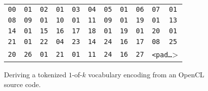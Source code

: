 \begin{figure}
{\begin{tabular}{l l l l l l l l l l l}
			\toprule
			\texttt{00} & \texttt{01} & \texttt{02} & \texttt{01} & \texttt{03} & \texttt{04} & \texttt{05} & \texttt{01} & \texttt{06} & \texttt{07} & \texttt{01} \\
			\texttt{08} & \texttt{09} & \texttt{01} & \texttt{10} & \texttt{01} & \texttt{11} & \texttt{09} & \texttt{01} & \texttt{19} & \texttt{01} & \texttt{13} \\
			\texttt{14} & \texttt{01} & \texttt{15} & \texttt{16} & \texttt{17} & \texttt{18} & \texttt{01} & \texttt{19} & \texttt{01} & \texttt{20} & \texttt{01} \\
			\texttt{21} & \texttt{01} & \texttt{22} & \texttt{04} & \texttt{23} & \texttt{14} & \texttt{24} & \texttt{16} & \texttt{17} & \texttt{08} & \texttt{25} \\
			\texttt{20} & \texttt{26} & \texttt{01} & \texttt{21} & \texttt{01} & \texttt{11} & \texttt{24} & \texttt{16} & \texttt{27} & \multicolumn{2}{l}{\texttt{<pad\ldots}>} \\
			\bottomrule
		\end{tabular}%
		\label{subfig:source_enc}%
	}%
	\caption{Deriving a tokenized $1$-of-$k$ vocabulary encoding from an OpenCL source code.}%
	\label{fig:encoding}%
\end{figure}
